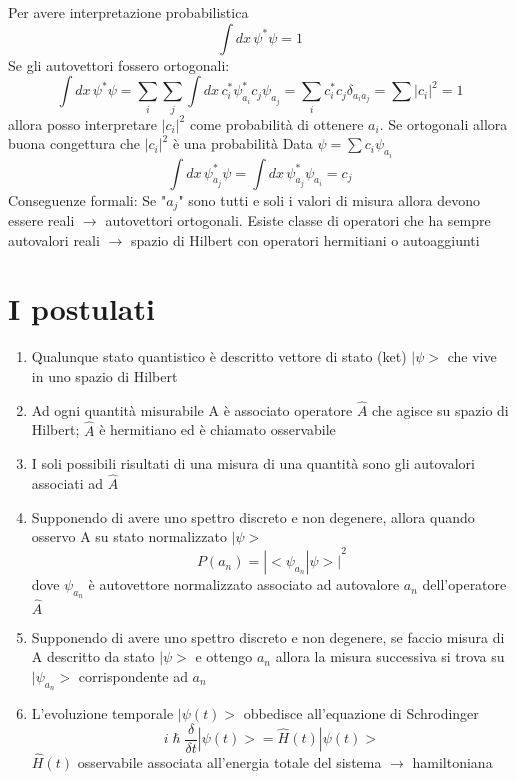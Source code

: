 Per avere interpretazione probabilistica 
\begin{equation*}
    \int dx \, \psi^*\psi = 1
\end{equation*}
Se gli autovettori fossero ortogonali:
\begin{equation*}
    \int dx \, \psi^*\psi = \sum_i \sum_j \int dx \, c_i^* \psi_{a_i}^*c_j\psi_{a_j} = \sum_i c_i^*c_j \delta_{a_ia_j}= \sum {|c_i|}^2 = 1
\end{equation*}
allora posso interpretare ${|c_i|}^2$ come probabilità di ottenere $a_i$. Se ortogonali allora buona congettura che ${|c_i|}^2$ è una probabilità \newline
Data $\psi = \sum c_i \psi_{a_i}$
\begin{equation*}
    \int dx \, \psi_{a_j}^*\psi = \int dx \, \psi_{a_j}^*\psi_{a_i} = c_j
\end{equation*}
Conseguenze formali: \newline
Se "$a_j$" sono tutti e soli i valori di misura allora devono essere reali $\rightarrow$ autovettori ortogonali. Esiste classe di operatori che ha sempre autovalori reali $\rightarrow$ spazio di Hilbert con operatori hermitiani o autoaggiunti

\section*{I postulati}
\begin{enumerate}
    \item Qualunque stato quantistico è descritto vettore di stato (ket) $|\psi>$ che vive in uno spazio di Hilbert
    \item Ad ogni quantità misurabile A è associato operatore $\hat{A}$ che agisce su spazio di Hilbert; $\hat{A}$ è hermitiano ed è chiamato osservabile
    \item I soli possibili risultati di una misura di una quantità sono gli autovalori associati ad $\hat{A}$ 
    \item Supponendo di avere uno spettro discreto e non degenere, allora quando osservo A su stato normalizzato $|\psi>$ 
    \begin{equation*}
        P(a_n) = {|<\psi_{a_n}|\psi>|}^2
    \end{equation*}
    dove $\psi_{a_n}$ è autovettore normalizzato associato ad autovalore $a_n$ dell'operatore $\hat{A}$ 
    \item Supponendo di avere uno spettro discreto e non degenere, se faccio misura di A descritto da stato $|\psi>$ e ottengo $a_n$ allora la misura successiva si trova su $|\psi_{a_n}>$ corrispondente ad $a_n$
    \item L'evoluzione temporale $|\psi(t)>$ obbedisce all'equazione di Schrodinger
    \begin{equation*}
        i\hslash \frac{\delta}{\delta t}|\psi(t)> = \hat{H}(t)|\psi(t)>
    \end{equation*}
    $\hat{H}(t)$ osservabile associata all'energia totale del sistema $\rightarrow$ hamiltoniana
\end{enumerate}

